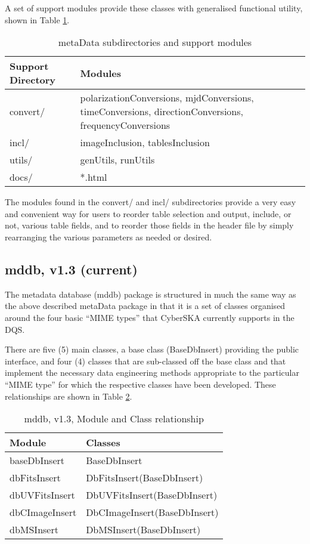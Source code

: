 \documentclass[11pt,twoside]{article}
\begin{document}
A set of support modules provide these classes with generalised
functional utility, shown in Table \ref{tab:subdirs}.
\begin{table}[htbp]
  \centering
  \begin{tabular}{|l|p{9.0cm}|} 
    \hline
    \sc \textbf{Support Directory} & \textbf{Modules} \\
    \hline
    convert/ & polarizationConversions, mjdConversions, timeConversions,
               directionConversions, frequencyConversions \\
    incl/   &  imageInclusion, tablesInclusion \\
    utils/  &  genUtils, runUtils \\
    \hline
    docs/   &  *.html\\
    \hline
  \end{tabular}
  \caption{metaData subdirectories and support modules}
  \label{tab:subdirs}
\end{table}

The modules found in the convert/ and incl/ subdirectories provide a very
easy and convenient way for users to reorder table selection and output, include, or not, 
various table fields, and to reorder those fields in the header file by simply rearranging
the various parameters as needed or desired.

\subsection{mddb, v1.3 (current)}
\label{sec:mddb}
The metadata database (mddb) package is structured in much the same
way as the above described metaData package in that it is a set of classes
organised around the four basic ``MIME types'' that CyberSKA currently
supports in the DQS.

There are five (5) main classes, a base class (BaseDbInsert)
providing the public interface, and four (4) classes that are
sub-classed off the base class and that implement the
necessary data engineering methods appropriate to the particular
``MIME type'' for which the respective classes have been
developed. These relationships are shown in Table \ref{tab:mddbmods}.

\begin{table}[htbp]
  \centering
  \begin{tabular}{|l|p{8.0cm}|} 
    \hline
    \sc \textbf{Module} & \textbf{Classes} \\
    \hline
    baseDbInsert & BaseDbInsert \\
    dbFitsInsert   & DbFitsInsert(BaseDbInsert) \\
    dbUVFitsInsert& DbUVFitsInsert(BaseDbInsert)\\
    dbCImageInsert& DbCImageInsert(BaseDbInsert)\\
    dbMSInsert & DbMSInsert(BaseDbInsert)\\
    \hline
  \end{tabular}
  \caption{mddb, v1.3, Module and Class relationship}
  \label{tab:mddbmods}
\end{table}
\end{document}
